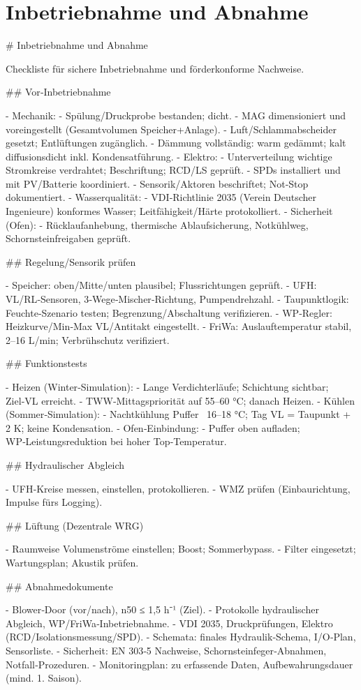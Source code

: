 \documentclass[11pt,oneside]{report}
\begin{document}
\chapter{Inbetriebnahme und Abnahme}
\begin{markdown}
# Inbetriebnahme und Abnahme

Checkliste für sichere Inbetriebnahme und förderkonforme Nachweise.

## Vor‑Inbetriebnahme

- Mechanik:
  - Spülung/Druckprobe bestanden; dicht.
  - MAG dimensioniert und voreingestellt (Gesamtvolumen Speicher+Anlage).
  - Luft/Schlammabscheider gesetzt; Entlüftungen zugänglich.
  - Dämmung vollständig: warm gedämmt; kalt diffusionsdicht inkl. Kondensatführung.
- Elektro:
  - Unterverteilung wichtige Stromkreise verdrahtet; Beschriftung; RCD/LS geprüft.
  - SPDs installiert und mit PV/Batterie koordiniert.
  - Sensorik/Aktoren beschriftet; Not‑Stop dokumentiert.
- Wasserqualität:
- VDI‑Richtlinie 2035 (Verein Deutscher Ingenieure) konformes Wasser; Leitfähigkeit/Härte protokolliert.
- Sicherheit (Ofen):
  - Rücklaufanhebung, thermische Ablaufsicherung, Notkühlweg, Schornsteinfreigaben geprüft.

## Regelung/Sensorik prüfen

- Speicher: oben/Mitte/unten plausibel; Flussrichtungen geprüft.
- UFH: VL/RL‑Sensoren, 3‑Wege‑Mischer‑Richtung, Pumpendrehzahl.
- Taupunktlogik: Feuchte‑Szenario testen; Begrenzung/Abschaltung verifizieren.
- WP‑Regler: Heizkurve/Min‑Max VL/Antitakt eingestellt.
- FriWa: Auslauftemperatur stabil, 2–16 L/min; Verbrühschutz verifiziert.

## Funktionstests

- Heizen (Winter‑Simulation):
  - Lange Verdichterläufe; Schichtung sichtbar; Ziel‑VL erreicht.
  - TWW‑Mittagspriorität auf 55–60 °C; danach Heizen.
- Kühlen (Sommer‑Simulation):
  - Nachtkühlung Puffer ~16–18 °C; Tag VL = Taupunkt + 2 K; keine Kondensation.
- Ofen‑Einbindung:
  - Puffer oben aufladen; WP‑Leistungsreduktion bei hoher Top‑Temperatur.

## Hydraulischer Abgleich

- UFH‑Kreise messen, einstellen, protokollieren.
- WMZ prüfen (Einbaurichtung, Impulse fürs Logging).

## Lüftung (Dezentrale WRG)

- Raumweise Volumenströme einstellen; Boost; Sommerbypass.
- Filter eingesetzt; Wartungsplan; Akustik prüfen.

## Abnahmedokumente

- Blower‑Door (vor/nach), n50 ≤ 1,5 h⁻¹ (Ziel).
- Protokolle hydraulischer Abgleich, WP/FriWa‑Inbetriebnahme.
- VDI 2035, Druckprüfungen, Elektro (RCD/Isolationsmessung/SPD).
- Schemata: finales Hydraulik‑Schema, I/O‑Plan, Sensorliste.
- Sicherheit: EN 303‑5 Nachweise, Schornsteinfeger‑Abnahmen, Notfall‑Prozeduren.
- Monitoringplan: zu erfassende Daten, Aufbewahrungsdauer (mind. 1. Saison).
\end{markdown}
\end{document}
